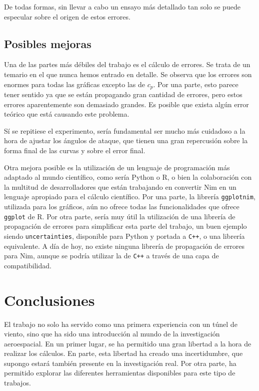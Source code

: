 \documentclass{article}
\begin{document}
De todas formas, sin llevar a cabo un ensayo más detallado tan solo se puede especular sobre el origen de estos errores.

\subsection{Posibles mejoras}

Una de las partes más débiles del trabajo es el cálculo de errores. Se trata de un temario en el que nunca hemos entrado 
en detalle. Se observa que los errores son enormes para todas 
las gráficas excepto las de $c_p$. Por una parte, esto parece tener sentido ya que se están propagando gran cantidad de errores,
pero estos errores aparentemente son demasiado grandes. Es posible que exista algún error teórico que está causando este problema.

Sí se repitiese el experimento, sería fundamental ser mucho más cuidadoso a la hora de ajustar 
los ángulos de ataque, que tienen una gran repercusión sobre la forma final de las curvas y sobre el error final. 

Otra mejora posible es la utilización de un lenguaje de programación más adaptado al mundo científico, como sería Python o R, o bien 
la colaboración con la multitud de desarrolladores que están trabajando en convertir Nim en un lenguaje apropiado para 
el cálculo científico. Por una parte, la librería \verb+ggplotnim+, utilizada para los gráficos, aún no ofrece todas las funcionalidades
que ofrece \verb+ggplot+ de R. Por otra parte, sería muy útil la utilización de una librería de propagación de errores para 
simplificar esta parte del trabajo, un buen ejemplo siendo \verb+uncertainties+, disponible para Python y portada a \verb-C++-, o una
librería equivalente. A día de hoy, no existe ninguna librería de propagación de errores para Nim, aunque se podría utilizar 
la de \verb-C++- a través de una capa de compatibilidad.

\section{Conclusiones}

El trabajo no solo ha servido como una primera experiencia con un túnel de viento, sino que ha sido una introducción al mundo
de la investigación aeroespacial. En un primer lugar, se ha permitido una gran libertad a la hora de realizar los cálculos. 
En parte, esta libertad ha creado una incertidumbre, que supongo estará también presente en la investigación real. Por otra parte,
ha permitido explorar las diferentes herramientas disponibles para este tipo de trabajos. 
\end{document}
